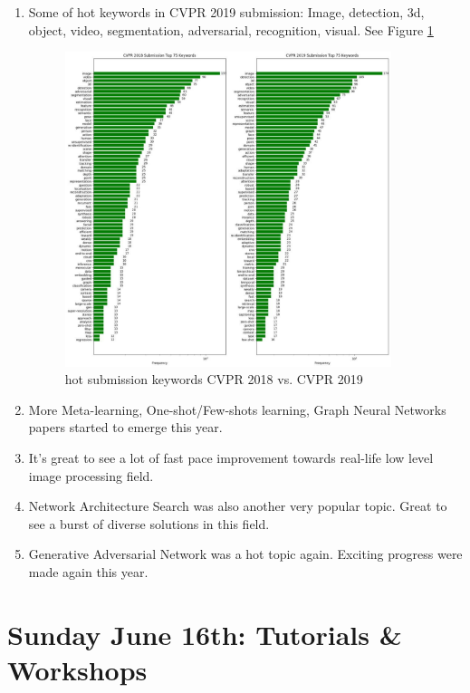 \documentclass[11pt]{article}
\begin{document}
\begin{enumerate}
    \newpage
    \item Some of hot keywords in CVPR 2019 submission: Image, detection, 3d, object, video, segmentation, adversarial, recognition, visual. See Figure \ref{fig:Conf_HL3}
    \begin{figure}[ht!]
        \centering
        \includegraphics[width=0.9\textwidth]{images/Image3.jpeg}
        \caption{hot submission keywords CVPR 2018 vs. CVPR 2019}
        \label{fig:Conf_HL3}
    \end{figure}
    
    \item More Meta-learning, One-shot/Few-shots learning, Graph Neural Networks papers started to emerge this year.
    \item It's great to see a lot of fast pace improvement towards real-life low level image processing field.
    \item Network Architecture Search was also another very popular topic. Great to see a burst of diverse solutions in this field.
    \item Generative Adversarial Network was a hot topic again. Exciting progress were made again this year.
\end{enumerate}{}

\newpage
\section{Sunday June 16th: Tutorials \& Workshops}

\end{document}
